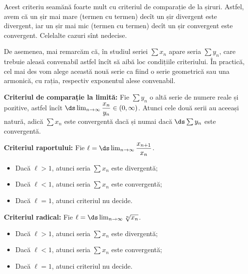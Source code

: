 Acest criteriu seamănă foarte mult cu criteriul de comparație de la șiruri.
Astfel, avem că un șir mai mare (termen cu termen) decît un șir divergent este
divergent, iar un șir mai mic (termen cu termen) decît un șir convergent este
convergent. Celelalte cazuri sînt nedecise.

De asemenea, mai remarcăm că, în studiul seriei $ \sum x_n $ apare seria $ \sum y_n $,
care trebuie aleasă convenabil astfel încît să aibă loc condițiile criteriului.
În practică, cel mai des vom alege această nouă serie ca fiind o serie geometrică
sau una armonică, cu rația, respectiv exponentul alese convenabil.

\vspace{1cm}

\textbf{Criteriul de comparație la limită:} Fie $ \sum y_n $ o altă serie de numere
reale și pozitive, astfel încît $ \ds\lim_{n \to \infty} \dfrac{x_n}{y_n} \in (0, \infty) $.
Atunci cele două serii au aceeași natură, adică $ \sum x_n $ este convergentă
dacă și numai dacă $ \ds\sum y_n $ este convergentă.

\vspace{1cm}

\textbf{Criteriul raportului:} Fie $ \ell = \ds\lim_{n \to \infty} \dfrac{x_{n+1}}{x_n} $.
\begin{itemize}
    \item Dacă $ \ell > 1 $, atunci seria $ \sum x_n $ este divergentă;
    \item Dacă $ \ell < 1 $, atunci seria $ \sum x_n $ este convergentă;
    \item Dacă $ \ell = 1 $, atunci criteriul nu decide.
\end{itemize}

\vspace{1cm}

\textbf{Criteriul radical:} Fie $ \ell = \ds\lim_{n \to \infty} \sqrt[n]{x_n} $.
\begin{itemize}
    \item Dacă $ \ell > 1 $, atunci seria $ \sum x_n $ este divergentă;
    \item Dacă $ \ell < 1 $, atunci seria $ \sum x_n $ este convergentă;
    \item Dacă $ \ell = 1 $, atunci criteriul nu decide.
\end{itemize}

\newpage
